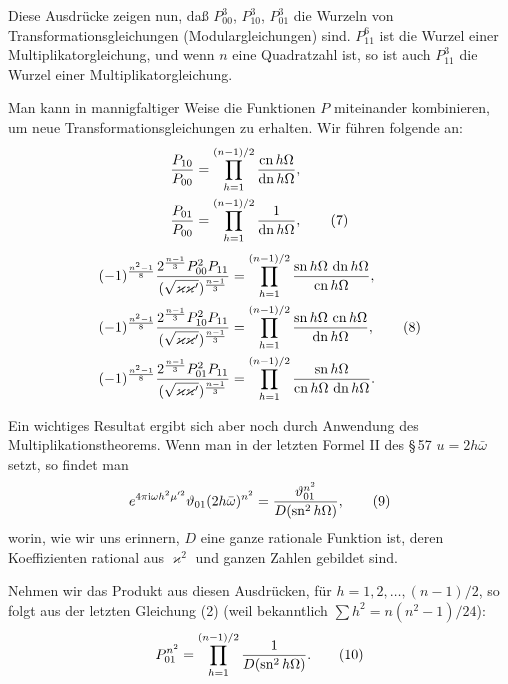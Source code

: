 \documentclass[11pt]{article}
\providecommand{\sn}{\operatorname{sn}}
\providecommand{\cn}{\operatorname{cn}}
\providecommand{\dn}{\operatorname{dn}}
\providecommand{\ii}{\mathrm{i}}
\begin{document}
Diese Ausdrücke zeigen nun, daß $P_{00}^3$, $P_{10}^3$, $P_{01}^3$ die Wurzeln von
Transformationsgleichungen (Modulargleichungen) sind. $P_{11}^6$ ist die Wurzel einer
Multiplikatorgleichung, und wenn $n$ eine Quadratzahl ist, so ist auch $P_{11}^3$ die
Wurzel einer Multiplikatorgleichung.

Man kann in mannigfaltiger Weise die Funktionen $P$ miteinander kombinieren, um neue
Transformationsgleichungen zu erhalten. Wir führen folgende an:
\begin{align}
 {P_{10}\over P_{00}}&=\prod_{h=1}^{(n-1)/2}{\cn h\Omega\over \dn h\Omega},\notag\\
 {P_{01}\over P_{00}}&=\prod_{h=1}^{(n-1)/2}{1\over \dn h\Omega},
\tag{7}
\end{align}
\begin{align}
 (-1)^{\frac{n^2-1}{8}}{2^{\frac{n-1}{3}}P_{00}^2P_{11}\over(\sqrt{\varkappa\varkappa'})^{\frac{n-1}{3}}}
 &=\prod_{h=1}^{(n-1)/2}{\sn h\Omega\,\dn h\Omega\over\cn h\Omega},\notag\\
 (-1)^{\frac{n^2-1}{8}}{2^{\frac{n-1}{3}}P_{10}^2P_{11}\over(\sqrt{\varkappa\varkappa'})^{\frac{n-1}{3}}}
 &=\prod_{h=1}^{(n-1)/2}{\sn h\Omega\,\cn h\Omega\over\dn h\Omega},
\tag{8}\\
 (-1)^{\frac{n^2-1}{8}}{2^{\frac{n-1}{3}}P_{01}^2P_{11}\over(\sqrt{\varkappa\varkappa'})^{\frac{n-1}{3}}}
 &=\prod_{h=1}^{(n-1)/2}{\sn h\Omega\over\cn h\Omega\,\dn h\Omega}.\notag
\end{align}

Ein wichtiges Resultat ergibt sich aber noch durch Anwendung des Multiplikationstheorems.
Wenn man in der letzten Formel II des \S\,57 $u=2h\bar\omega$ setzt, so findet man
\begin{equation}
 e^{4\pi\ii\omega h^2\mu'^2}\vartheta_{01}(2h\bar\omega)^{n^2}
 ={\vartheta_{01}^{n^2}\over D(\sn^2h\Omega)},
\tag{9}
\end{equation}
worin, wie wir uns erinnern, $D$ eine ganze rationale Funktion ist, deren Koeffizienten
rational aus $\varkappa^2$ und ganzen Zahlen gebildet sind.

Nehmen wir das Produkt aus diesen Ausdrücken, für
$h=1,2,\ldots,(n-1)/2$, so folgt aus der letzten Gleichung (2) (weil bekanntlich
$\sum h^2=n(n^2-1)/24$):
\begin{equation}
 P_{01}^{n^2}=\prod_{h=1}^{(n-1)/2}{1\over D(\sn^2h\Omega)}.
\tag{10}
\end{equation}
\end{document}
